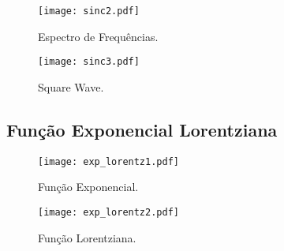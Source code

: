 \begin{figure}[!ht]
    \centering
    \begin{minipage}[b]{0.49\textwidth}
        \centering
        \texttt{[image: sinc2.pdf]}
        \caption{Espectro de Frequências.}
    \end{minipage}
    \hfill
    \begin{minipage}[b]{0.49\textwidth}
        \centering
        \texttt{[image: sinc3.pdf]}
        \caption{Square Wave.}
    \end{minipage}
\end{figure}

\newpage

\subsection{Função Exponencial \boldmath{$\rightarrow$} Lorentziana}



\begin{figure}[!ht]
    \centering
    \begin{minipage}[b]{0.49\textwidth}
        \centering
        \texttt{[image: exp\_lorentz1.pdf]}
        \caption{Função Exponencial.}
    \end{minipage}
    \hfill
    \begin{minipage}[b]{0.49\textwidth}
        \centering
        \texttt{[image: exp\_lorentz2.pdf]}
        \caption{Função Lorentziana.}
    \end{minipage}
\end{figure}